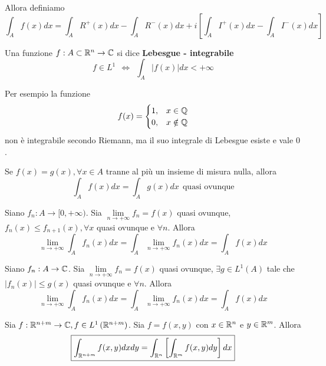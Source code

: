 Allora definiamo
\begin{equation*}
\int_{A} f(x) dx = \int_{A} R^{+}(x) dx - \int_{A} R^{-}(x) dx + i\left[\int_{A} I^{+}(x) dx - \int_{A} I^{-}(x) dx\right]
\end{equation*}
\begin{defn}
Una funzione $f: A\subset \mathbb{R}^{n}\rightarrow \mathbb{C}$ si dice \textbf{Lebesgue - integrabile}
\begin{equation*}
\boxed{f\in L^{1} \ \ \iff \ \ \int_{A}| f(x)| dx < + \infty}
\end{equation*}
\end{defn}
Per esempio la funzione
\begin{equation*}
f(x) =
\begin{cases}
1, & x\in \mathbb{Q}\\
0, & x\notin \mathbb{Q}
\end{cases}
\end{equation*}
non è integrabile secondo Riemann, ma il suo integrale di Lebesgue esiste e vale $0$.
\begin{rem}
Se $f(x) = g(x), \forall x\in A$ tranne al più un insieme di misura nulla, allora
\begin{equation*}
\int_{A} f(x) dx = \int_{A} g(x) dx\ \ \text{quasi ovunque}
\end{equation*}
\end{rem}
\begin{thm}
Siano $f_{n} : A\rightarrow [0, + \infty)$. Sia $\lim\limits_{n\rightarrow + \infty} f_{n} = f(x)$ quasi ovunque, $f_{n}(x) \leq f_{n + 1}(x), \forall x$ quasi ovunque e $\forall n$. Allora
\begin{equation*}
\boxed{\lim\limits_{n\rightarrow + \infty}\int_{A} f_{n}(x) dx = \int_{A}\lim\limits_{n\rightarrow + \infty} f_{n}(x) dx = \int_{A} f(x) dx}
\end{equation*}
\end{thm}
\begin{thm}
Siano $f_{n} : A\rightarrow \mathbb{C}$. Sia $\lim\limits_{n\rightarrow + \infty} f_{n} = f(x)$ quasi ovunque, $\exists g\in L^{1}(A)$ tale che $| f_{n}(x)| \leq g(x)$ quasi ovunque e $\forall n$. Allora
\begin{equation*}
\boxed{\lim\limits_{n\rightarrow + \infty}\int_{A} f_{n}(x) dx = \int_{A}\lim\limits_{n\rightarrow + \infty} f_{n}(x) dx = \int_{A} f(x) dx}
\end{equation*}
\end{thm}
\begin{thm}
[di Fubini]
Sia $f: \mathbb{R}^{n + m}\rightarrow \mathbb{C}, f\in L^{1}\left(\mathbb{R}^{n + m}\right)$. Sia $f = f(x, y)$ con $x\in \mathbb{R}^{n}$ e $y\in \mathbb{R}^{m}$. Allora
\begin{equation*}
\boxed{\int_{\mathbb{R}^{n + m}} f(x, y) dxdy = \int_{\mathbb{R}^{n}}\left[\int_{\mathbb{R}^{m}} f(x, y) dy\right] dx}
\end{equation*}
\end{thm}

